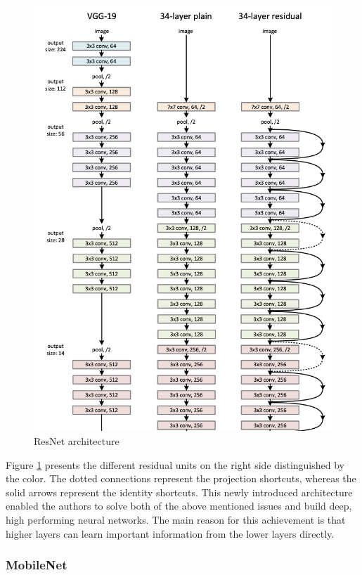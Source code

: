 \begin{figure}[ht]
  \centering
  \includegraphics[width=\linewidth]{figures/resnet.png}
  \caption{ResNet architecture\cite{he2015deep}}
  \label{fig:resnet}
\end{figure}

Figure \ref{fig:resnet} presents the different residual units on the right side distinguished by the color. The dotted connections represent the projection shortcuts, whereas the solid arrows represent the identity shortcuts.
This newly introduced architecture enabled the authors to solve both of the above mentioned issues and build deep, high performing neural networks. The main reason for this achievement is that higher layers can learn important information from the lower layers directly.

\subsubsection{MobileNet}\label{mobilenet}

